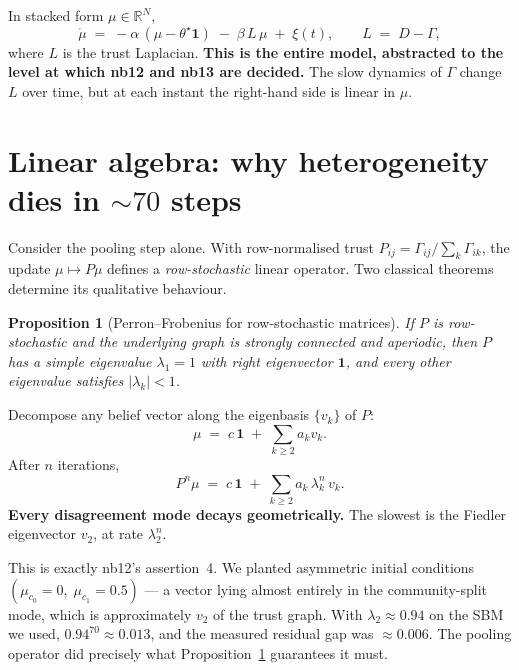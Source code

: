 \documentclass[11pt,a4paper]{article}
\theoremstyle{plain}
\newtheorem{proposition}{Proposition}
\begin{document}
In stacked form $\mu \in \mathbb{R}^N$,
\begin{equation}
\dot{\mu} \;=\; -\alpha\,(\mu - \theta^\star \mathbf{1})
              \;-\; \beta\,L\,\mu \;+\; \xi(t),
\qquad
L \;=\; D - \Gamma,
\label{eq:mu-dot-vector}
\end{equation}
where $L$ is the trust Laplacian. \textbf{This is the entire model,
abstracted to the level at which nb12 and nb13 are decided.} The slow
dynamics of $\Gamma$ change $L$ over time, but at each instant the
right-hand side is linear in $\mu$.

\section{Linear algebra: why heterogeneity dies in ${\sim}70$ steps}
\label{sec:perron}

Consider the pooling step alone. With row-normalised trust
$P_{ij} = \Gamma_{ij}/\sum_k \Gamma_{ik}$, the update $\mu \mapsto P\mu$
defines a \emph{row-stochastic} linear operator. Two classical theorems
determine its qualitative behaviour.

\begin{proposition}[Perron--Frobenius for row-stochastic matrices]
\label{prop:pf}
If $P$ is row-stochastic and the underlying graph is strongly connected
and aperiodic, then $P$ has a simple eigenvalue $\lambda_1 = 1$ with
right eigenvector $\mathbf{1}$, and every other eigenvalue satisfies
$|\lambda_k| < 1$.
\end{proposition}

Decompose any belief vector along the eigenbasis $\{v_k\}$ of $P$:
\[
\mu \;=\; c\,\mathbf{1} \;+\; \sum_{k \geq 2} a_k v_k.
\]
After $n$ iterations,
\[
P^n \mu \;=\; c\,\mathbf{1} \;+\; \sum_{k \geq 2} a_k\,\lambda_k^n\, v_k.
\]
\textbf{Every disagreement mode decays geometrically.} The slowest is
the Fiedler eigenvector $v_2$, at rate $\lambda_2^n$.

This is exactly nb12's assertion~4. We planted asymmetric initial
conditions $(\mu_{c_0}=0,\;\mu_{c_1}=0.5)$ --- a vector lying almost
entirely in the community-split mode, which is approximately $v_2$ of
the trust graph. With $\lambda_2 \approx 0.94$ on the SBM we used,
$0.94^{70} \approx 0.013$, and the measured residual gap was
$\approx 0.006$. The pooling operator did precisely what
Proposition~\ref{prop:pf} guarantees it must.
\end{document}
